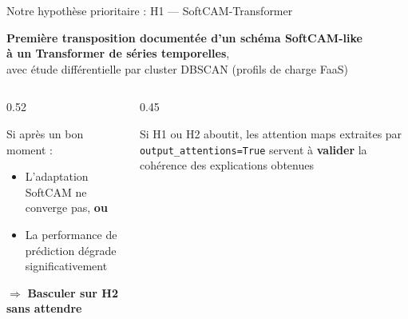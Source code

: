 \documentclass[10pt]{beamer}
\begin{document}
\begin{frame}{Notre hypothèse prioritaire : H1 --- SoftCAM-Transformer}
  \begin{tcolorbox}[
    colback=blue!3, colframe=blue!40!black,
    arc=2mm, boxrule=0.5pt, fonttitle=\bfseries,
    title={Contribution scientifique visée}]
    \centering
    \textbf{Première transposition documentée d'un schéma SoftCAM-like\\
    à un Transformer de séries temporelles},\\
    avec étude différentielle par cluster DBSCAN (profils de charge FaaS)
  \end{tcolorbox}

  \vspace{6pt}
  \begin{columns}
    \begin{column}{0.52\textwidth}
      \begin{tcolorbox}[
        colback=orange!3, colframe=orange!50!black,
        arc=2mm, boxrule=0.5pt, fonttitle=\bfseries,
        title={Critère de bascule vers H2}]
        Si après un bon moment :
        \begin{itemize}
          \item L'adaptation SoftCAM ne converge pas, \textbf{ou}
          \item La performance de prédiction dégrade significativement
        \end{itemize}
        $\Rightarrow$ \textbf{Basculer sur H2 sans attendre}
      \end{tcolorbox}
    \end{column}
    \begin{column}{0.45\textwidth}
      \begin{tcolorbox}[
        colback=gray!5, colframe=gray!50!black,
        arc=2mm, boxrule=0.5pt, fonttitle=\bfseries,
        title={H3 --- Attention weights (validation)}]
        Si H1 ou H2 aboutit, les attention maps extraites par
        \texttt{output\_attentions=True} servent à \textbf{valider}
        la cohérence des explications obtenues
      \end{tcolorbox}
    \end{column}
  \end{columns}
\end{frame}
\end{document}
